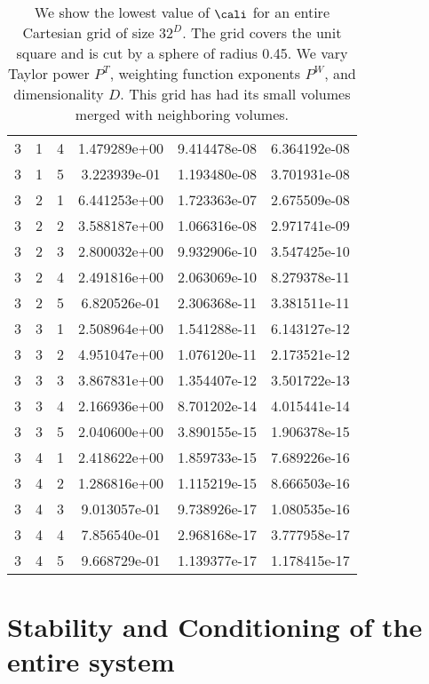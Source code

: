 \documentclass{article}
\begin{document}
{\begin{small}
\begin{table}
\begin{center}
\begin{tabular}{|ccc|ccc|}
3 & 1 & 4 &  1.479289e+00 & 9.414478e-08 & 6.364192e-08 \\
3 & 1 & 5 &  3.223939e-01 & 1.193480e-08 & 3.701931e-08 \\
3 & 2 & 1 &  6.441253e+00 & 1.723363e-07 & 2.675509e-08 \\
3 & 2 & 2 &  3.588187e+00 & 1.066316e-08 & 2.971741e-09 \\
3 & 2 & 3 &  2.800032e+00 & 9.932906e-10 & 3.547425e-10 \\
3 & 2 & 4 &  2.491816e+00 & 2.063069e-10 & 8.279378e-11 \\
3 & 2 & 5 &  6.820526e-01 & 2.306368e-11 & 3.381511e-11 \\
3 & 3 & 1 &  2.508964e+00 & 1.541288e-11 & 6.143127e-12 \\
3 & 3 & 2 &  4.951047e+00 & 1.076120e-11 & 2.173521e-12 \\
3 & 3 & 3 &  3.867831e+00 & 1.354407e-12 & 3.501722e-13 \\
3 & 3 & 4 &  2.166936e+00 & 8.701202e-14 & 4.015441e-14 \\
3 & 3 & 5 &  2.040600e+00 & 3.890155e-15 & 1.906378e-15 \\
3 & 4 & 1 &  2.418622e+00 & 1.859733e-15 & 7.689226e-16 \\
3 & 4 & 2 &  1.286816e+00 & 1.115219e-15 & 8.666503e-16 \\
3 & 4 & 3 &  9.013057e-01 & 9.738926e-17 & 1.080535e-16 \\
3 & 4 & 4 &  7.856540e-01 & 2.968168e-17 & 3.777958e-17 \\
3 & 4 & 5 &  9.668729e-01 & 1.139377e-17 & 1.178415e-17 \\
\hline
\end{tabular}
\end{center}
\label{fig::mergedSolvability}
\caption
    {
      We show the lowest value of
      $\cali$ for an entire Cartesian grid of size $32^D$.
      The grid covers the unit square and is cut by a sphere of radius 0.45.
      We vary Taylor power $P^T$, weighting
      function exponents $P^W$, and dimensionality $D$.    This grid
      has had its small volumes merged with neighboring volumes.
    }
\end{table}
\end{small}

 
\section{Stability and Conditioning of the entire system}

}
\end{document}

